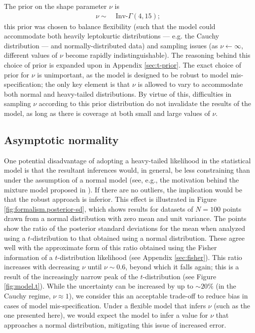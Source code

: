 \documentclass[fleqn,usenatbib]{rasti}
\begin{document}
The prior on the shape parameter $\nu$ is
\begin{align}
    \nu \sim&\; \text{Inv-}\Gamma(4, 15);
\end{align}
this prior was chosen to balance flexibility (such that the model could
accommodate both heavily leptokurtic distributions --- e.g. the Cauchy
distribution --- and normally-distributed data) and sampling issues (as $\nu
\leftarrow \infty$, different values of $\nu$ become rapidly indistinguishable).
The reasoning behind this choice of prior is expanded upon in Appendix
\ref{sec:t-prior}. The exact choice of prior for $\nu$ is unimportant, as the
model is designed to be robust to model mis-specification; the only key element
is that $\nu$ is allowed to vary to accommodate both normal and heavy-tailed
distributions. By virtue of this, difficulties in sampling $\nu$ according to
this prior distribution do not invalidate the results of the model, as long as
there is coverage at both small and large values of $\nu$.

\subsection{Asymptotic normality}
\label{sec:formalism.asymptotic}

One potential disadvantage of adopting a heavy-tailed likelihood in the
statistical model is that the resultant inferences would, in general, be less
constraining than under the assumption of a normal model (see, e.g., the
motivation behind the mixture model proposed in \citealt{Tak:2019}).  If there
are no outliers, the implication would be that the robust approach is inferior.
This effect is illustrated in Figure \ref{fig:formalism.posterior-sd}, which
shows results for datasets of $N=100$ points drawn from a normal distribution
with zero mean and unit variance. The points show the ratio of the posterior
standard deviations for the mean when analyzed using a $t$-distribution to that
obtained using a normal distribution. These agree well with the approximate form
of this ratio obtained using the Fisher information of a $t$-distribution
likelihood (see Appendix \ref{sec:fisher}). This ratio increases with decreasing
$\nu$ until $\nu \sim 0.6$, beyond which it falls again; this is a result of the
increasingly narrow peak of the $t$-distribution (see Figure \ref{fig:model.t}).
While the uncertainty can be increased by up to $\sim20\%$ (in the Cauchy
regime, $\nu \approx 1$), we consider this an acceptable trade-off to reduce
bias in cases of model mis-specification. Under a flexible model that infers
$\nu$ (such as the one presented here), we would expect the model to infer a
value for $\nu$ that approaches a normal distribution, mitigating this issue of
increased error.
\end{document}
